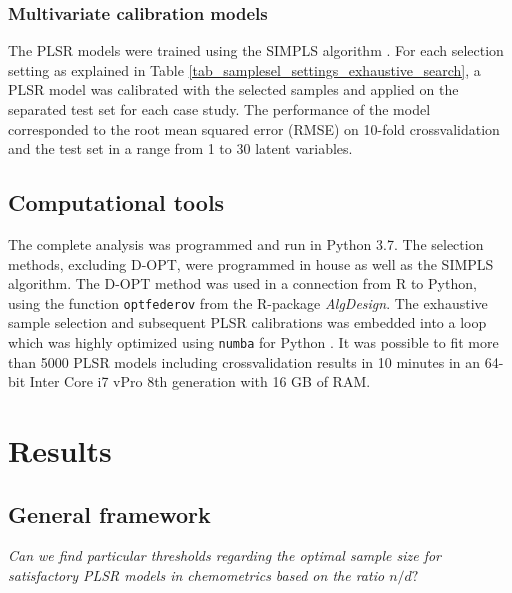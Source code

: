 \documentclass[journal=ancham,manuscript=article]{achemso}
\begin{document}
\subsubsection*{Multivariate calibration models}

The PLSR models were trained using the SIMPLS algorithm \cite{DeJong1993}. For each selection setting as explained in Table \ref{tab_samplesel_settings_exhaustive_search}, a PLSR model was calibrated with the selected samples and applied on the separated test set for each case study. The performance of the model corresponded to the root mean squared error (RMSE)  on 10-fold crossvalidation and the test set in a range from 1 to 30 latent variables. 

\subsection*{Computational tools}

The complete analysis was programmed and run in Python 3.7. The selection methods, excluding D-OPT, were programmed in house as well as the SIMPLS algorithm. The D-OPT method was used in a connection from R to Python, using the function \texttt{optfederov} from the R-package \emph{AlgDesign}\cite{Wheeler2019}. The exhaustive sample selection and subsequent PLSR calibrations was embedded into a loop which was highly optimized using \texttt{numba} for Python \cite{Lam2015}. It was possible to fit more than 5000 PLSR models including crossvalidation results in 10 minutes in an 64-bit Inter Core i7 vPro 8th generation with 16 GB of RAM. 



\section*{Results}\label{results}

\subsection*{General framework}\label{results:genframework}

\emph{Can  we  find  particular  thresholds  regarding the optimal sample size for satisfactory PLSR models in chemometrics based on the ratio $n/d?$}
\end{document}
